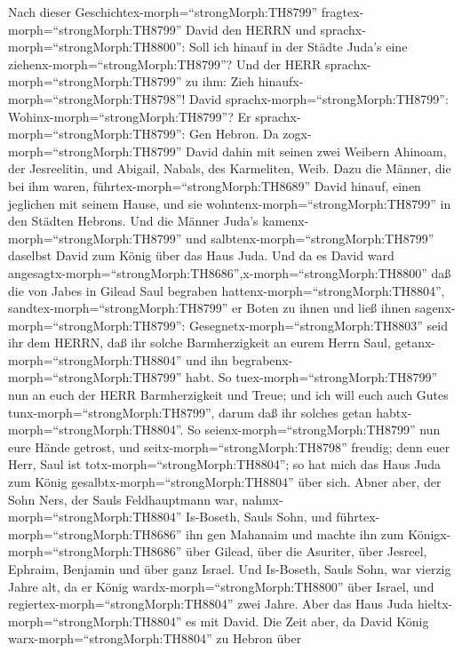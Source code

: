  Nach dieser Geschichtex-morph=``strongMorph:TH8799''
fragtex-morph=``strongMorph:TH8799'' David den HERRN und
sprachx-morph=``strongMorph:TH8800'': Soll ich hinauf in der Städte
Juda's eine ziehenx-morph=``strongMorph:TH8799''? Und der HERR
sprachx-morph=``strongMorph:TH8799'' zu ihm: Zieh
hinaufx-morph=``strongMorph:TH8798''! David
sprachx-morph=``strongMorph:TH8799'':
Wohinx-morph=``strongMorph:TH8799''? Er
sprachx-morph=``strongMorph:TH8799'': Gen Hebron.  Da
zogx-morph=``strongMorph:TH8799'' David dahin mit seinen zwei Weibern
Ahinoam, der Jesreelitin, und Abigail, Nabals, des Karmeliten, Weib.
 Dazu die Männer, die bei ihm waren,
führtex-morph=``strongMorph:TH8689'' David hinauf, einen jeglichen mit
seinem Hause, und sie wohntenx-morph=``strongMorph:TH8799'' in den
Städten Hebrons.  Und die Männer Juda's
kamenx-morph=``strongMorph:TH8799'' und
salbtenx-morph=``strongMorph:TH8799'' daselbst David zum König über das
Haus Juda. Und da es David ward
angesagtx-morph=``strongMorph:TH8686'',x-morph=``strongMorph:TH8800''
daß die von Jabes in Gilead Saul begraben
hattenx-morph=``strongMorph:TH8804'', 
sandtex-morph=``strongMorph:TH8799'' er Boten zu ihnen und ließ ihnen
sagenx-morph=``strongMorph:TH8799'':
Gesegnetx-morph=``strongMorph:TH8803'' seid ihr dem HERRN, daß ihr
solche Barmherzigkeit an eurem Herrn Saul,
getanx-morph=``strongMorph:TH8804'' und ihn
begrabenx-morph=``strongMorph:TH8799'' habt.  So
tuex-morph=``strongMorph:TH8799'' nun an euch der HERR Barmherzigkeit
und Treue; und ich will euch auch Gutes
tunx-morph=``strongMorph:TH8799'', darum daß ihr solches getan
habtx-morph=``strongMorph:TH8804''.  So
seienx-morph=``strongMorph:TH8799'' nun eure Hände getrost, und
seitx-morph=``strongMorph:TH8798'' freudig; denn euer Herr, Saul ist
totx-morph=``strongMorph:TH8804''; so hat mich das Haus Juda zum König
gesalbtx-morph=``strongMorph:TH8804'' über sich.  Abner
aber, der Sohn Ners, der Sauls Feldhauptmann war,
nahmx-morph=``strongMorph:TH8804'' Is-Boseth, Sauls Sohn, und
führtex-morph=``strongMorph:TH8686'' ihn gen Mahanaim  und
machte ihn zum Königx-morph=``strongMorph:TH8686'' über Gilead, über die
Asuriter, über Jesreel, Ephraim, Benjamin und über ganz Israel.
 Und Is-Boseth, Sauls Sohn, war vierzig Jahre alt, da er
König wardx-morph=``strongMorph:TH8800'' über Israel, und
regiertex-morph=``strongMorph:TH8804'' zwei Jahre. Aber das Haus Juda
hieltx-morph=``strongMorph:TH8804'' es mit David.  Die Zeit
aber, da David König warx-morph=``strongMorph:TH8804'' zu Hebron über
